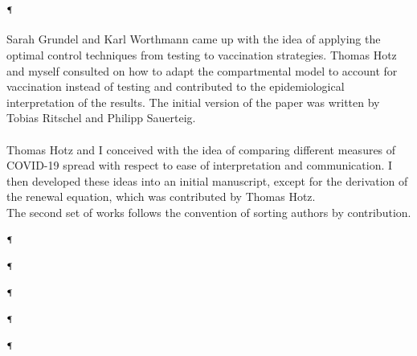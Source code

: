 \begin{refsection}[ownpubs]
\paragraph{\cite{Grundel2021How}$^{\mathparagraph}$}
Sarah Grundel and Karl Worthmann came up with the idea of applying the optimal control techniques from testing to vaccination strategies. Thomas Hotz and myself consulted on how to adapt the compartmental model to account for vaccination instead of testing and contributed to the epidemiological interpretation of the results. The initial version of the paper was written by Tobias Ritschel and Philipp Sauerteig.

\paragraph{\cite{Heyder2023Measures}}
Thomas Hotz and I conceived with the idea of comparing different measures of COVID-19 spread with respect to ease of interpretation and communication. I then developed these ideas into an initial manuscript, except for the derivation of the renewal equation, which was contributed by Thomas Hotz. \\[18pt]
The second set of works follows the convention of sorting authors by contribution.

\paragraph{\cite{Bracher2021Preregistered}$^\mathparagraph$}
\paragraph{\cite{Bracher2022National}$^\mathparagraph$}
\paragraph{\cite{Sherratt2022Predictive}$^\mathparagraph$}
\paragraph{\cite{Brockhaus2023Why}$^\mathparagraph$}
\paragraph{\cite{Wolffram2023Collaborative}$^\mathparagraph$}

\printbibliography[heading=none]
\end{refsection}

